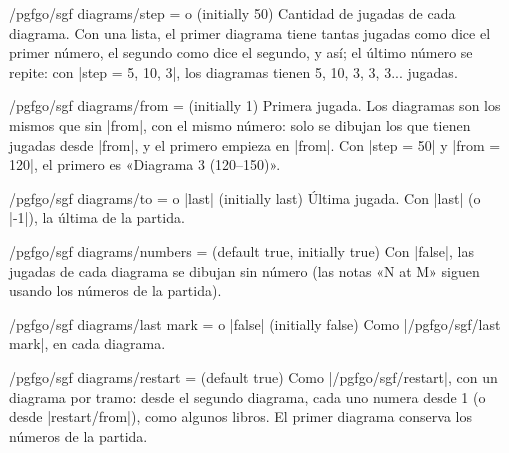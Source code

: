 
\begin{key}{/pgfgo/sgf diagrams/step =  o  (initially 50)}
	Cantidad de jugadas de cada diagrama. Con una lista, el primer diagrama tiene tantas jugadas como dice el primer número, el segundo como dice el segundo, y así; el último número se repite: con |step = {5, 10, 3}|, los diagramas tienen 5, 10, 3, 3, 3... jugadas.
\end{key}

\begin{key}{/pgfgo/sgf diagrams/from =  (initially 1)}
	Primera jugada. Los diagramas son los mismos que sin |from|, con el mismo número: solo se dibujan los que tienen jugadas desde |from|, y el primero empieza en |from|. Con |step = 50| y |from = 120|, el primero es «Diagrama 3 (120--150)».
\end{key}

\begin{key}{/pgfgo/sgf diagrams/to =  o |last| (initially last)}
	Última jugada. Con |last| (o |-1|), la última de la partida.
\end{key}

\begin{key}{/pgfgo/sgf diagrams/numbers =  (default true, initially true)}
	Con |false|, las jugadas de cada diagrama se dibujan sin número (las notas «N at M» siguen usando los números de la partida).
\end{key}

\begin{key}{/pgfgo/sgf diagrams/last mark =  o |false| (initially false)}
	Como |/pgfgo/sgf/last mark|, en cada diagrama.

	\begin{codeexample}
	\end{codeexample}

\end{key}

\begin{key}{/pgfgo/sgf diagrams/restart =  (default true)}
	Como |/pgfgo/sgf/restart|, con un diagrama por tramo: desde el segundo diagrama, cada uno numera desde 1 (o desde |restart/from|), como algunos libros. El primer diagrama conserva los números de la partida.

	\begin{codeexample}
	\end{codeexample}
\end{key}

